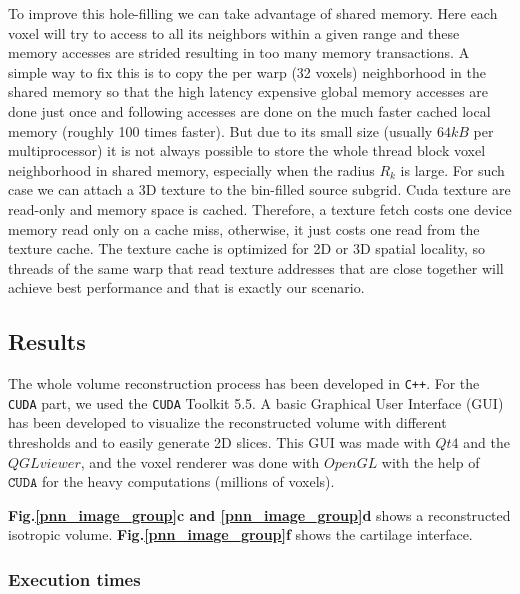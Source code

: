 \documentclass[12pt,journal,compsoc]{IEEEtran}
\begin{document}
To improve this hole-filling we can take advantage of shared memory.
Here each voxel will try to access to all its neighbors within a given range and these memory accesses are strided resulting in too many memory transactions.
A simple way to fix this is to copy the per warp (32 voxels) neighborhood in the shared memory so that the high latency expensive global memory accesses are done just once and following accesses are done on the much faster cached local memory (roughly 100 times faster).
But due to its small size (usually $64kB$ per multiprocessor) it is not always possible to store the whole thread block voxel neighborhood in shared memory, especially when the radius $R_k$ is large.
For such case we can attach a 3D texture to the bin-filled source subgrid.
Cuda texture are read-only and memory space is cached.
Therefore, a texture fetch costs one device memory read only on a cache miss, otherwise, it just costs one read from the texture cache.
The texture cache is optimized for 2D or 3D spatial locality, so threads of the same warp that read texture addresses that are close together will achieve best performance and that is exactly our scenario.

\subsection{Results}

The whole volume reconstruction process has been developed in \texttt{C++}.
For the \texttt{CUDA} part, we used the \texttt{CUDA} Toolkit 5.5.
A basic Graphical User Interface (GUI) has been developed to visualize the reconstructed volume with different thresholds and to easily generate 2D slices.
This GUI was made with $Qt4$ and the $QGLviewer$, and the voxel renderer was done with $OpenGL$ with the help of $\texttt{CUDA}$ for the heavy computations (millions of voxels).

\textbf{Fig.\ref{pnn_image_group}c and \ref{pnn_image_group}d} shows a reconstructed isotropic volume. \textbf{Fig.\ref{pnn_image_group}f} shows the cartilage interface.

\subsubsection{Execution times}
\end{document}
